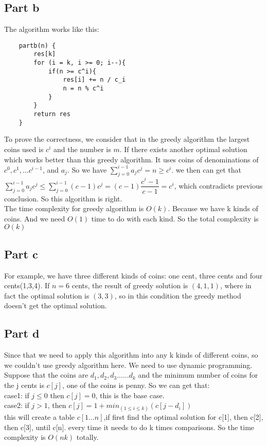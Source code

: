 \documentclass[paper=a4, fontsize=11pt]{scrartcl} %
\numberwithin{equation}{section} %
\numberwithin{figure}{section} %
\numberwithin{table}{section} %
\begin{document}
\subsection{\textbf{Part b}}
The algorithm works like this:
\begin{verbatim}
    partb(n) {
        res[k]
        for (i = k, i >= 0; i--){
            if(n >= c^i){
                res[i] += n / c_i
                n = n % c^i
            }
        }
        return res
    }
\end{verbatim}
To prove the correctness, we consider that in the greedy algorithm the largest coins used is $c^i$ and the number is $m$. If there exists another optimal solution which works better than this greedy algorithm. It uses coins of denominations of $c^0, c^1, ... c^{i - 1}$, and $a_j$. So we have $\sum_{j = 0}^{i - 1} a_j c^j = n \geq c^i$. we then can get that $\sum_{j = 0}^{i - 1} a_j c^j \leq \sum_{j = 0}^{i - 1} (c - 1) c^j = (c - 1) \dfrac{c^i - 1}{c - 1} = c^i $, which contradicts previous conclusion. So this algorithm is right.\\
The time complexity for greedy algorithm is $O(k)$. Because we have k kinds of coins. And we need $O(1)$ time to do with each kind. So the total complexity is $O(k)$

\subsection{\textbf{Part c}}
For example, we have three different kinds of coins: one cent, three cents and four cents(1,3,4). If $n=6$ cents, the result of greedy solution is ${(4,1,1)}$, where in fact the optimal solution is ${(3,3)}$, so in this condition the greedy method doesn't get the optimal solution.

\subsection{\textbf{Part d}}
Since that we need to apply this algorithm into any k kinds of different coins, so we couldn't use greedy algorithm here. We need to use dynamic programming.\\
Suppose that the coins are $d_1,d_2,d_3......d_k$ and the minimum number of coins for the j cents is $c[j]$, one of the coins is penny.
So we can get that:\\
case1: if $j\leq 0$ then $c[j]=0$, this is the base case.\\
case2: if $j>1$, then $c[j]=1+min_{(1 \leq i \leq k)}{(c[j-d_i])}$\\ this will create a table $c[1...n]$,if first find the optimal solution for c[1], then c[2], then c[3], until c[n]. every time it needs to do k times comparisons. So the time complexity is $O(nk)$ totally.
\end{document}

